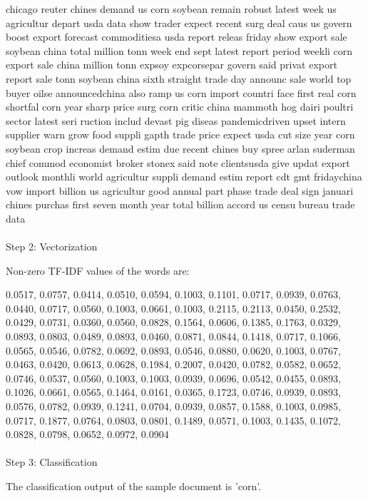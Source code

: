 chicago reuter chines demand us corn soybean remain robust latest week us agricultur depart usda data show trader expect recent surg deal caus us govern boost export forecast commoditiesa usda report releas friday show export sale soybean china total million tonn week end sept latest report period weekli corn export sale china million tonn expsoy expcorsepar govern said privat export report sale tonn soybean china sixth straight trade day announc sale world top buyer oilse announcedchina also ramp us corn import countri face first real corn shortfal corn year sharp price surg corn critic china mammoth hog dairi poultri sector latest seri ruction includ devast pig diseas pandemicdriven upset intern supplier warn grow food suppli gapth trade price expect usda cut size year corn soybean crop increas demand estim due recent chines buy spree arlan suderman chief commod economist broker stonex said note clientsusda give updat export outlook monthli world agricultur suppli demand estim report cdt gmt fridaychina vow import billion us agricultur good annual part phase trade deal sign januari chines purchas first seven month year total billion accord us censu bureau trade data
\\\\
Step 2: Vectorization

Non-zero TF-IDF values of the words are:

0.0517, 0.0757, 0.0414, 0.0510, 0.0594, 0.1003, 0.1101, 0.0717, 0.0939, 0.0763, 0.0440, 0.0717, 0.0560, 0.1003, 0.0661, 0.1003, 0.2115, 0.2113, 0.0450, 0.2532, 0.0429, 0.0731, 0.0360, 0.0560, 0.0828, 0.1564, 0.0606, 0.1385, 0.1763, 0.0329, 0.0893, 0.0803, 0.0489, 0.0893, 0.0460, 0.0871, 0.0844, 0.1418, 0.0717, 0.1066, 0.0565, 0.0546, 0.0782, 0.0692, 0.0893, 0.0546, 0.0880, 0.0620, 0.1003, 0.0767, 0.0463, 0.0420, 0.0613, 0.0628, 0.1984, 0.2007, 0.0420, 0.0782, 0.0582, 0.0652, 0.0746, 0.0537, 0.0560, 0.1003, 0.1003, 0.0939, 0.0696, 0.0542, 0.0455, 0.0893, 0.1026, 0.0661, 0.0565, 0.1464, 0.0161, 0.0365, 0.1723, 0.0746, 0.0939, 0.0893, 0.0576, 0.0782, 0.0939, 0.1241, 0.0704, 0.0939, 0.0857, 0.1588, 0.1003, 0.0985, 0.0717, 0.1877, 0.0764, 0.0803, 0.0801, 0.1489, 0.0571, 0.1003, 0.1435, 0.1072, 0.0828, 0.0798, 0.0652, 0.0972, 0.0904
\\\\
Step 3: Classification

The classification output of the sample document is 'corn'.
